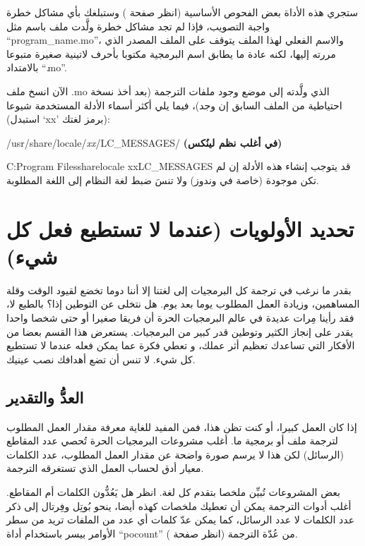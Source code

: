 ستجري هذه الأداة بعض الفحوص الأساسية (انظر صفحة
\at[ref:37415529]) وستبلغك بأي مشاكل خطرة واجبة التصويب، فإذا
لم تجد مشاكل خطرة ولَّدت ملف باسم مثل “program\_name.mo”، والاسم الفعلي
لهذا الملف يتوقف على الملف المصدر الذي مررته إليها، لكنه عادة ما يطابق
اسم البرمجية مكتوبا بأحرف لاتينية صغيرة متبوعا بالامتداد “‪.mo‬”.

الآن انسخ ملف ‪.mo‬ الذي ولَّدته إلى موضع وجود ملفات الترجمة (بعد أخذ
نسخة احتياطية من الملف السابق إن وجد)، فيما يلي أكثر أسماء الأدلة
المستخدمة شيوعا (استبدل ‘xx’ برمز لغتك):

\startitemize[1]
\item /usr/share/locale/{\it xx}/LC\_MESSAGES/ {\bf (في أغلب نظم
لينُكس)}
\item C: Program Files share locale
xx LC\_MESSAGES
\stopitemize
قد يتوجب إنشاء هذه الأدلة إن لم تكن موجودة (خاصة في وندوز) ولا تنسَ ضبط
لغة النظام إلى اللغة المطلوبة.

\section[ref:36383525]{تحديد الأولويات (عندما لا تستطيع فعل كل شيء)}
بقدر ما نرغب في ترجمة كل البرمجيات
إلى لغتنا إلا أننا دوما تخضع لقيود الوقت وقلة المساهمين، وزيادة العمل
المطلوب يوما بعد يوم. هل نتخلى عن التوطين إذا؟ بالطبع لا، فقد رأينا
مِرات عديدة في عالم البرمجيات الحرة أن فريقا صغيرا أو حتى شخصا واحدا
يقدر على إنجاز الكثير وتوطين قدر كبير من البرمجيات. يستعرض هذا القسم
بعضا من الأفكار التي تساعدك تعظيم أثر عملك، و تعطي فكرة عما يمكن فعله
عندما لا تستطيع كل شيء. لا تنس أن تضع أهدافك نصب عينيك.

\subsection[ref:33531520]{العدُّ والتقدير}
إذا كان العمل كبيرا، أو كنت تظن
هذا، فمن المفيد للغاية معرفة مقدار العمل المطلوب لترجمة ملف أو برمجية
ما. أغلب مشروعات البرمجيات الحرة تُحصي عدد المقاطع (الرسائل) لكن هذا لا
يرسم صورة واضحة عن مقدار العمل المطلوب، عدد الكلمات معيار أدق لحساب
العمل الذي تستغرقه الترجمة.

بعض المشروعات تُبيِّن ملخصا بتقدم كل لغة. انظر هل يَعُدُّون الكلمات أم
المقاطع. أغلب أدوات الترجمة يمكن أن تعطيك ملخصات كهذه أيضا، ينحو بُوتِل
وفِرتال إلى ذكر عدد الكلمات لا عدد الرسائل، كما يمكن عدّ كلمات أي عدد
من الملفات تريد من سطر الأوامر بيسر باستخدام أداة “pocount” من عُدّة
الترجمة (انظر صفحة \at[ref:20165030]). 

